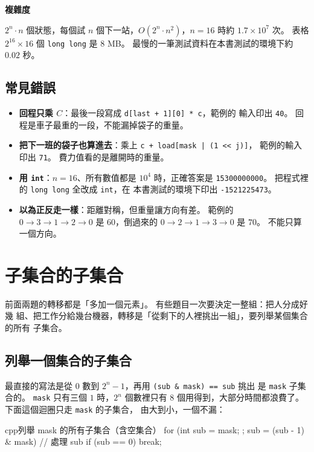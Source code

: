 \textbf{複雜度}

$2^n \cdot n$ 個狀態，每個試 $n$ 個下一站，$O(2^n \cdot n^2)$，$n = 16$ 時約
$1.7 \times 10^7$ 次。 表格 $2^{16} \times 16$ 個 \texttt{long long} 是
$8$ MB。 最慢的一筆測試資料在本書測試的環境下約 $0.02$ 秒。

\subsection{常見錯誤}

\begin{itemize}
\item \textbf{回程只乘 $C$}：最後一段寫成 \texttt{d[last + 1][0] * c}，範例的
輸入印出 \texttt{40}。 回程是車子最重的一段，不能漏掉袋子的重量。
\item \textbf{把下一班的袋子也算進去}：乘上 \texttt{c + load[mask | (1 << j)]}，
範例的輸入印出 \texttt{71}。 費力值看的是離開時的重量。
\item \textbf{用 \texttt{int}}：$n = 16$、所有數值都是 $10^4$ 時，正確答案是
\texttt{15300000000}。 把程式裡的 \texttt{long long} 全改成 \texttt{int}，在
本書測試的環境下印出 \texttt{-1521225473}。
\item \textbf{以為正反走一樣}：距離對稱，但重量讓方向有差。 範例的
$0 \to 3 \to 1 \to 2 \to 0$ 是 $60$，倒過來的 $0 \to 2 \to 1 \to 3 \to 0$ 是
$70$。 不能只算一個方向。
\end{itemize}

\section{子集合的子集合}
\label{sec:bm-submask}

前面兩題的轉移都是「多加一個元素」。 有些題目一次要決定一整組：把人分成好幾
組、把工作分給幾台機器，轉移是「從剩下的人裡挑出一組」，要列舉某個集合的所有
子集合。

\subsection{列舉一個集合的子集合}

最直接的寫法是從 $0$ 數到 $2^n - 1$，再用 \texttt{(sub \& mask) == sub} 挑出
是 \texttt{mask} 子集合的。 \texttt{mask} 只有三個 $1$ 時，$2^n$ 個數裡只有
$8$ 個用得到，大部分時間都浪費了。 下面這個迴圈只走 \texttt{mask} 的子集合，
由大到小，一個不漏：

\begin{code}{cpp}{列舉 mask 的所有子集合（含空集合）}
for (int sub = mask; ; sub = (sub - 1) & mask) {
    // 處理 sub
    if (sub == 0) {
        break;
    }
}
\end{code}

